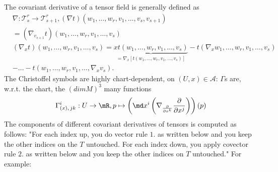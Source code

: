 The covariant derivative of a tensor field is generally defined as
\begin{align*}
	&\nabla : \mathcal{T}^r_s \rightarrow \mathcal{T}^r_{s+1}, (\nabla t) (w_1, \dots, w_r,v_1,\dots,v_s,v_{s+1}) \\
	&= (\nabla_{v_{s+1}} t)(w_1, \dots,w_r,v_1,\dots,v_s) \\
	&(\nabla_x t)(w_1, \dots, w_r,v_1,\dots,v_s) = \underbrace{ xt(w_1,\dots,w_r,v_1,\dots, v_s)}_{= \nabla_x \left[t(w_1,\dots ,w_r,v_1,\dots,v_s)\right]} - t(\nabla_x w_1,\dots,w_r,v_1,\dots,v_s) \\
	&-\dots- t(w_1,\dots,w_r,v_1,\dots,\nabla_x v_s).
\end{align*}
The Christoffel symbols are highly chart-dependent, on $(U,x) \in \mathcal{A}$: $\Gamma$s are, w.r.t. the chart, the $(dimM)^3$ many functions
\begin{equation}
	\Gamma^i_{(x), \, j k} : U \rightarrow \mR, p \mapsto \left(\md x^i \left(\nabla_{\frac{\partial}{\partial x^k}} \frac{\partial}{\partial x^j}\right)\right)(p)
\end{equation}
The components of different covariant derivatives of tensors is computed as follows:
"For each index up, you do vector rule $1.$ as written below and you keep the other indices on the $T$ untouched. For each index down, you apply covector rule $2.$ as written below and you keep the other indices on $T$ untouched." For example:
